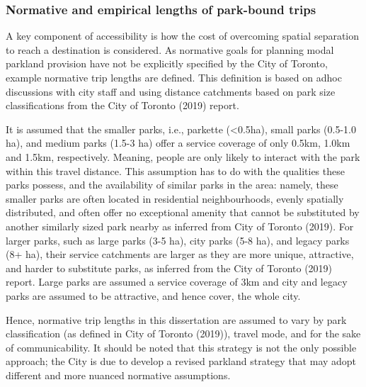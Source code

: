 \documentclass[
11pt, %
oneside, %
english, %
singlespacing, %
]{macthesis} %
\begin{document}
\subsubsection{Normative and empirical lengths of park-bound trips}\label{normative-and-empirical-lengths-of-park-bound-trips}

A key component of accessibility is how the cost of overcoming spatial separation to reach a destination is considered. As normative goals for planning modal parkland provision have not be explicitly specified by the City of Toronto, example normative trip lengths are defined. This definition is based on adhoc discussions with city staff and using distance catchments based on park size classifications from the City of Toronto (2019) report.

It is assumed that the smaller parks, i.e., parkette (\textless0.5ha), small parks (0.5-1.0 ha), and medium parks (1.5-3 ha) offer a service coverage of only 0.5km, 1.0km and 1.5km, respectively. Meaning, people are only likely to interact with the park within this travel distance. This assumption has to do with the qualities these parks possess, and the availability of similar parks in the area: namely, these smaller parks are often located in residential neighbourhoods, evenly spatially distributed, and often offer no exceptional amenity that cannot be substituted by another similarly sized park nearby as inferred from City of Toronto (2019). For larger parks, such as large parks (3-5 ha), city parks (5-8 ha), and legacy parks (8+ ha), their service catchments are larger as they are more unique, attractive, and harder to substitute parks, as inferred from the City of Toronto (2019) report. Large parks are assumed a service coverage of 3km and city and legacy parks are assumed to be attractive, and hence cover, the whole city.

Hence, normative trip lengths in this dissertation are assumed to vary by park classification (as defined in City of Toronto (2019)), travel mode, and for the sake of communicability. It should be noted that this strategy is not the only possible approach; the City is due to develop a revised parkland strategy that may adopt different and more nuanced normative assumptions.
\end{document}
